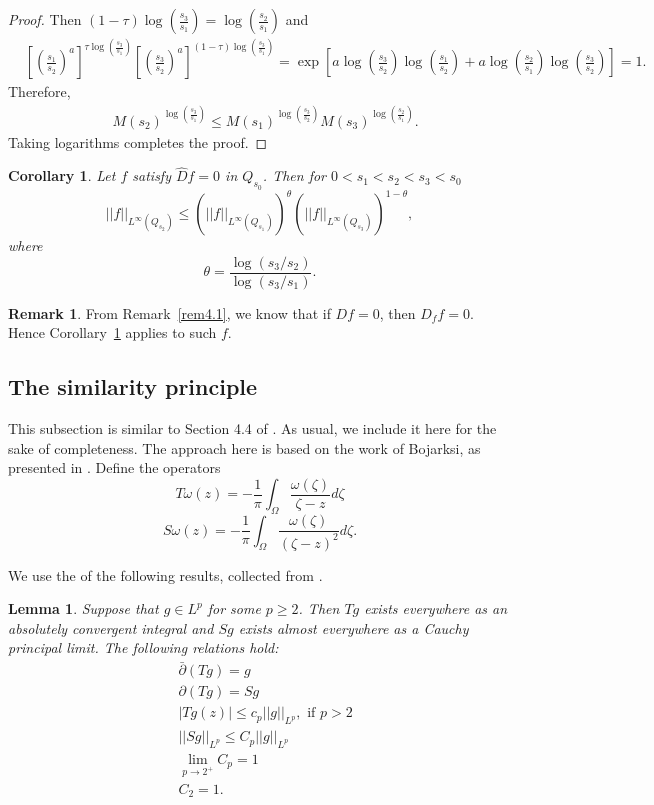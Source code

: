 \documentclass[12pt,reqno]{amsart}
\theoremstyle{plain}
\newtheorem{lem}{Lemma}
\newtheorem{cor}{Corollary}
\theoremstyle{definition}
\newtheorem*{rem}{Remark}
\newcommand{\te}{\theta}
\newcommand{\om}{\omega}
\newcommand{\Om}{\Omega}
\newcommand{\iny}{\infty}
\newcommand{\del}{ \partial}
\newcommand{\norm}[1]{\left\vert \left\vert #1\right\vert\right\vert}
\newcommand{\abs}[1]{\left\vert#1\right\vert}
\newcommand{\brac}[1]{\left[#1\right]}
\newcommand{\pr}[1]{\left( #1 \right) }
\begin{document}
\begin{proof}
Then $\pr{1-\tau} \log\pr{\frac{s_3}{s_1}} = \log\pr{\frac{s_2}{s_1}}$ and
\begin{align*}
&\brac{\pr{\frac{s_1}{s_2}}^a }^{\tau \log\pr{\frac{s_3}{s_1}}} \brac{\pr{\frac{s_3}{s_2}}^a }^{\pr{1-\tau}\log\pr{\frac{s_3}{s_1}}} 
= \exp\brac{a\log\pr{\frac{s_3}{s_2}} \log\pr{\frac{s_1}{s_2}} + a \log\pr{\frac{s_2}{s_1}} \log \pr{\frac{s_3}{s_2}} } = 1.
\end{align*}
Therefore,
\begin{align*}
& { M\pr{s_2}}^{\log\pr{\frac{s_3}{s_1}}} \le  { M\pr{s_1}}^{ \log\pr{\frac{s_3}{s_2}}} {M\pr{s_3}}^{\log\pr{\frac{s_2}{s_1}}}.
\end{align*}
Taking logarithms completes the proof.
\end{proof}

\begin{cor}
\label{3circle}
Let $f$ satisfy $\hat Df=0$  in $Q_{s_0}$. 
Then for $0<s_1<s_2<s_3 < s_0$
\[
\norm{f}_{L^\iny\pr{Q_{s_2}}} \le \pr{\norm{f}_{L^\iny\pr{Q_{s_1}}}}^\te \pr{\norm{f}_{L^\iny\pr{Q_{s_3}}}}^{1 - \te},
\]
where
\[
\te=\frac{\log(s_3/s_2)}{\log(s_3/s_1)}.
\]
\end{cor}
\begin{rem}
{From Remark~\ref{rem4.1}, we know that if $Df=0$, then $D_ff=0$. Hence Corollary~\ref{3circle} applies to such $f$}.
\end{rem}

\subsection{The similarity principle}

This subsection is similar to Section 4.4 of \cite{DKW17}. 
As usual, we include it here for the sake of completeness. 
The approach here is based on the work of Bojarksi, as presented in \cite{Boj09}. Define the operators
$$T{\om}\pr{z} = -\frac{1}{\pi} \int_\Om \frac{\om\pr{\zeta}}{\zeta - z} d\zeta$$
$$S \om \pr{z} = -\frac{1}{\pi} \int_\Om \frac{\om\pr{\zeta}}{\pr{\zeta - z}^2} d\zeta.$$

We use the of the following results, collected from \cite{Boj09}.

\begin{lem}
Suppose that $g \in L^p$ for some $p \ge 2$.  
Then $T g$ exists everywhere as an absolutely convergent integral and $S g$ exists almost everywhere as a Cauchy principal limit.
The following relations hold:
\begin{align*}
& \bar{\del} \pr{T g} = g \\
& \del \pr{T g} = S g \\
& \abs{T g\pr{z}} \le c_p \norm{g}_{L^p}, \text{ if } p > 2  \\
& \norm{S g}_{L^p} \le C_p \norm{g}_{L^p} \\
& \lim_{p \to 2^+} C_p = 1 \\
& C_2 = 1.
\end{align*}
\label{TResults}
\end{lem}
\end{document}
